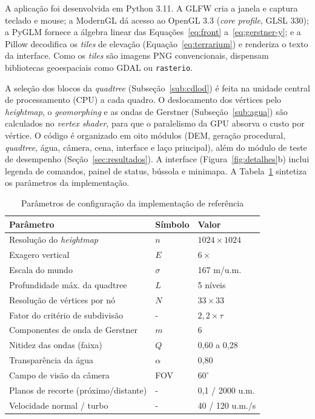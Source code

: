 \documentclass[conference]{IEEEtran}
\newcommand{\fonte}[1]{\par\vspace{2pt}{\footnotesize Fonte: #1\par}}
\begin{document}
A aplicação foi desenvolvida em Python 3.11. A GLFW cria a janela e captura
teclado e mouse; a ModernGL dá acesso ao OpenGL 3.3 (\emph{core profile},
GLSL 330); a PyGLM fornece a álgebra linear das
Equações~\eqref{eq:front} a~\eqref{eq:gerstner-y}; e a Pillow decodifica os
\emph{tiles} de elevação (Equação~\eqref{eq:terrarium}) e renderiza o texto da
interface. Como os \emph{tiles} são imagens PNG convencionais, dispensam
bibliotecas geoespaciais como GDAL ou \texttt{rasterio}.

A seleção dos blocos da \emph{quadtree} (Subseção~\ref{sub:cdlod}) é feita
na unidade central de processamento (CPU) a cada quadro. O deslocamento dos
vértices pelo \emph{heightmap}, o \emph{geomorphing} e as ondas de Gerstner
(Subseção~\ref{sub:agua}) são calculados no \emph{vertex shader}, para que o
paralelismo da GPU absorva o custo por vértice. O código é organizado em
oito módulos (DEM, geração procedural, \emph{quadtree}, água, câmera, cena,
interface e laço principal), além do módulo de teste de desempenho
(Seção~\ref{sec:resultados}). A interface (Figura~\ref{fig:detalhes}b) inclui legenda de comandos, painel de status, bússola e minimapa. A
Tabela~\ref{tab:parametros} sintetiza os parâmetros da implementação.

\begin{table}[t]
\caption{Parâmetros de configuração da implementação de referência}
\label{tab:parametros}
\centering
\begin{tabular}{@{}p{3.1cm}p{0.9cm}p{2.4cm}@{}}
\toprule
\textbf{Parâmetro} & \textbf{Símbolo} & \textbf{Valor} \\
\midrule
Resolução do \emph{heightmap} & $n$ & $1024 \times 1024$ \\
Exagero vertical & $E$ & $6\times$ \\
Escala do mundo & $\sigma$ & 167 m/u.m. \\
Profundidade máx. da quadtree & $L$ & 5 níveis \\
Resolução de vértices por nó & $N$ & $33 \times 33$ \\
Fator do critério de subdivisão & - & $2{,}2 \times \tau$ \\
Componentes de onda de Gerstner & $m$ & 6 \\
Nitidez das ondas (faixa) & $Q$ & 0,60 a 0,28 \\
Transparência da água & $\alpha$ & 0,80 \\
Campo de visão da câmera & FOV & $60^{\circ}$ \\
Planos de recorte (próximo/distante) & - & 0,1 / 2000 u.m. \\
Velocidade normal / turbo & - & 40 / 120 u.m./s \\
\bottomrule
\end{tabular}
\fonte{Elaborado pelos autores (2026), com base no código-fonte da implementação.}
\end{table}
\end{document}
